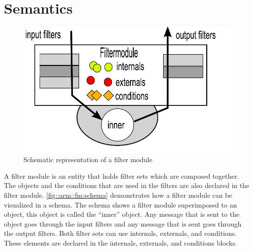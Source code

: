 \section*{Semantics}
\begin{figure}[tpb]
	\centering
	\includegraphics[style= fourthheight]{images/ARM-filtermodule}
	\caption{Schematic representation of a filter module}
	\label{fig::arm::fm:schema}
\end{figure}
A filter module is an entity that holds filter sets which are composed together.
The objects and the conditions that are used in the filters are also declared in the filter module.
\autoref{fig::arm::fm:schema} demonstrates
how a filter module can be visualized in a schema.
The schema shows a filter module superimposed to an object, this object is called the ``inner'' object.
Any message that is sent to the object goes through the input filters and any message that is sent
goes through the output filters. Both filter sets can use internals, externals, and conditions.
These elements are declared in the internals, externals, and conditions blocks.


